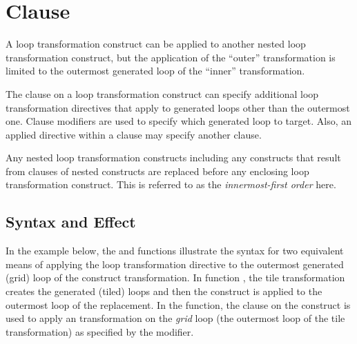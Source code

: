 \section{ Clause}
\label{sec:apply_clause}



A loop transformation construct can be applied to another nested
loop transformation construct, but the application of the ``outer'' transformation
is limited to the outermost generated loop of the ``inner'' transformation.

The  clause on a loop transformation construct can specify additional
loop transformation directives that apply to generated loops other than the outermost one.
Clause modifiers are used to specify which generated loop to target.
Also, an applied directive within a clause may specify another  clause.


Any nested loop transformation constructs including any constructs that
result from  clauses of nested constructs are replaced before any enclosing
loop transformation construct. This is referred to as the \emph{innermost-first order}
here.

\subsection{Syntax and Effect}

In the example below, the  and  functions
illustrate the syntax for two equivalent means of applying the  loop transformation
directive to the outermost generated (grid) loop of the  construct transformation.
In function , the tile transformation creates the generated (tiled) loops
and then the  construct is applied to the outermost loop of the replacement.
In the  function, the  clause on the  construct
is used to apply an  transformation on the \emph{grid} loop (the outermost loop
of the tile transformation) as specified by the  modifier.

